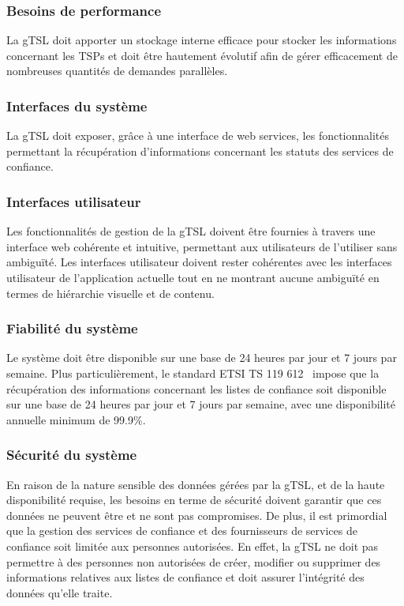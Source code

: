 \documentclass{tnreport}
\begin{document}
\subsubsection{Besoins de performance}

La gTSL doit apporter un stockage interne efficace pour stocker les informations concernant les TSPs et doit être hautement évolutif afin de gérer efficacement de nombreuses quantités de demandes parallèles.

\subsubsection{Interfaces du système}

La gTSL doit exposer, grâce à une interface de web services, les fonctionnalités permettant la récupération d'informations concernant les statuts des services de confiance.

\subsubsection{Interfaces utilisateur}

Les fonctionnalités de gestion de la gTSL doivent être fournies à travers une interface web cohérente et intuitive, permettant aux utilisateurs de l'utiliser sans ambiguïté. 
Les interfaces utilisateur doivent rester cohérentes avec les interfaces utilisateur de l'application actuelle tout en ne montrant aucune ambiguïté en termes de hiérarchie visuelle et de contenu.

\subsubsection{Fiabilité du système}

Le système doit être disponible sur une base de 24 heures par jour et 7 jours par semaine. Plus
particulièrement, le standard ETSI TS 119 612~\cite{ETSITS119612} impose que la récupération des informations concernant les listes de confiance soit disponible sur une base de 24 heures par jour et 7 jours par semaine, avec une disponibilité annuelle minimum de 99.9\%.

\subsubsection{Sécurité du système}

En raison de la nature sensible des données gérées par la gTSL, et de la haute disponibilité requise, les besoins en terme de sécurité doivent garantir que ces données ne peuvent être et ne sont pas compromises. De plus, il est primordial que la gestion des services de confiance et des fournisseurs de services de confiance soit limitée aux personnes autorisées.
En effet, la gTSL ne doit pas permettre à des personnes non autorisées de créer, modifier ou supprimer des informations relatives aux listes de confiance et doit assurer l'intégrité des données qu'elle traite.
\end{document}
